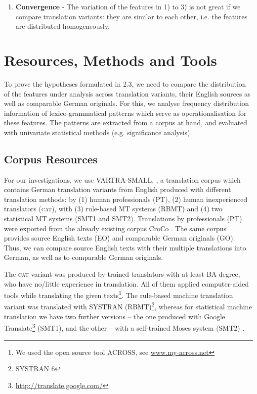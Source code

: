 \documentclass[output=paper]{LSP/langsci}
\begin{document}
\begin{enumerate}
\item \textbf{Convergence} - The variation of the features in 1) to 3) is not great if we compare translation variants: they are similar to each other, i.e. the features are distributed homogeneously.
\end{enumerate}

\section{Resources, Methods and Tools}

To prove the hypotheses formulated in 2.3, we need to compare the distribution of the features under analysis across translation variants, their English sources as well as comparable German originals. For this, we analyse frequency distribution information of lexico-grammatical patterns which serve as operationalisation for these features. The patterns are extracted from a corpus at hand, and evaluated with univariate statistical methods (e.g. significance analysis).

\subsection{Corpus Resources}
For our investigations, we use VARTRA-SMALL, \citep[see][]{Lapshinova2013}, a translation corpus which contains German translation variants from English produced with different translation methods: by (1) human professionals (PT), (2) human inexperienced translators (\textsc{cat}), with (3) rule-based MT systems (RBMT) and (4) two statistical MT systems (SMT1 and SMT2). Translations by professionals (PT) were exported from the already existing corpus CroCo \citep{HansenSchirra2013}. The same corpus provides source English texts (EO) and comparable German originals (GO). Thus, we can compare source English texts with their multiple translations into German, as well as to comparable German originals.

The \textsc{cat} variant was produced by trained translators with at least BA degree, who have no/little experience in translation. All of them applied computer-aided tools while translating the given texts\footnote{We used the open source tool ACROSS, see \url{www.my-across.net}}. The rule-based machine translation variant was translated with SYSTRAN (RBMT)\footnote{SYSTRAN 6}, whereas for statistical machine translation we have two further versions – the one produced with Google Translate\footnote{\url{http://translate.google.com/}} (SMT1), and the other – with a self-trained Moses system (SMT2) \citep[see][]{Hoang2007}.
\end{document}

